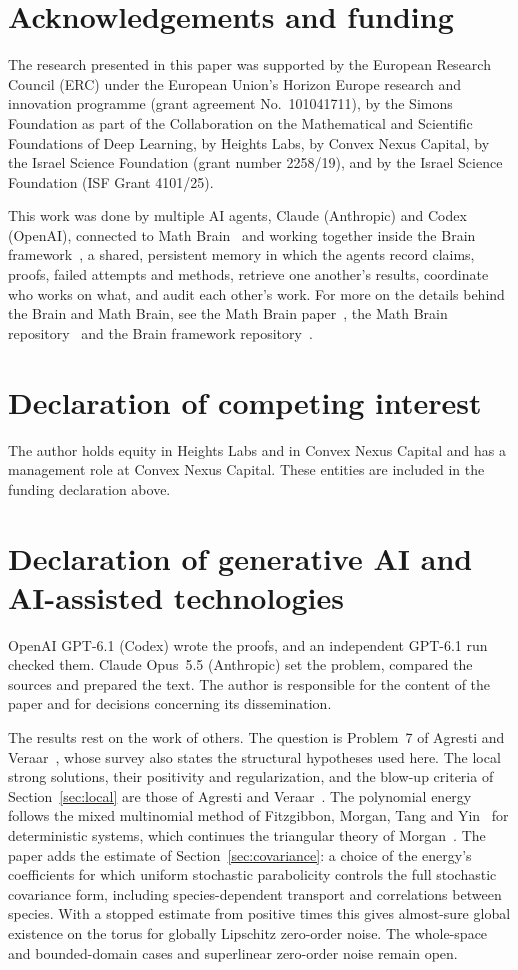 \documentclass[11pt]{amsart}
\theoremstyle{definition}
\numberwithin{equation}{section}
\begin{document}
\section*{Acknowledgements and funding}
The research presented in this paper was supported by the European Research
Council (ERC) under the European Union's Horizon Europe research and
innovation programme (grant agreement No.~101041711), by the Simons
Foundation as part of the Collaboration on the Mathematical and Scientific
Foundations of Deep Learning, by Heights Labs, by Convex Nexus Capital, by
the Israel Science Foundation (grant number 2258/19), and by the Israel
Science Foundation (ISF Grant 4101/25).

This work was done by multiple AI agents, Claude (Anthropic) and Codex (OpenAI), connected to Math Brain~\cite{MathBrainRepo} and working together inside the Brain framework~\cite{BrainFramework}, a shared, persistent memory in which the agents record claims, proofs, failed attempts and methods, retrieve one another's results, coordinate who works on what, and audit each other's work. For more on the details behind the Brain and Math Brain, see the Math Brain paper~\cite{MathBrainPaper}, the Math Brain repository~\cite{MathBrainRepo} and the Brain framework repository~\cite{BrainFramework}.

\section*{Declaration of competing interest}
The author holds equity in Heights Labs and in Convex Nexus Capital and
has a management role at Convex Nexus Capital. These entities are included
in the funding declaration above.

\section*{Declaration of generative AI and AI-assisted technologies}
OpenAI GPT-6.1 (Codex) wrote the proofs, and an independent GPT-6.1 run
checked them. Claude Opus~5.5 (Anthropic) set the problem, compared the
sources and prepared the text. The author is responsible for the content
of the paper and for decisions concerning its dissemination.

The results rest on the work of others. The question is Problem~7 of
Agresti and Veraar~\cite{AVsurvey}, whose survey also states the
structural hypotheses used here. The local strong solutions, their
positivity and regularization, and the blow-up criteria of
Section~\ref{sec:local} are those of Agresti and Veraar~\cite{AVlocal}.
The polynomial energy follows the mixed multinomial method of
Fitzgibbon, Morgan, Tang and Yin~\cite{FMTY} for deterministic systems,
which continues the triangular theory of Morgan~\cite{Morgan89,Morgan90}.
The paper adds the estimate of Section~\ref{sec:covariance}: a choice
of the energy's coefficients for which uniform stochastic parabolicity
controls the full stochastic covariance form, including species-dependent
transport and correlations between species. With a stopped estimate from
positive times this gives almost-sure global existence on the torus for
globally Lipschitz zero-order noise. The whole-space and bounded-domain
cases and superlinear zero-order noise remain open.
\end{document}

